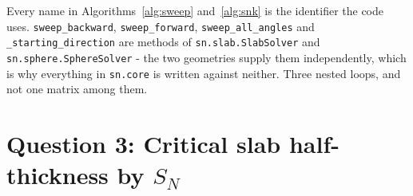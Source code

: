 \documentclass[11pt]{article}
\begin{document}
\begin{algorithm}[tbp]
\caption{The two iterations - scattering inside, Bell \& Glasstone outside -
         \texttt{homework3.sn.core}}
\label{alg:snk}
\BlankLine
{}
\BlankLine
{}
\end{algorithm}

\begin{sloppypar}
Every name in Algorithms~\ref{alg:sweep} and~\ref{alg:snk} is the identifier
the code uses. \texttt{sweep\_backward}, \texttt{sweep\_forward},
\texttt{sweep\_all\_angles} and
\texttt{\_starting\_direction} are methods of \texttt{sn.slab.SlabSolver} and
\texttt{sn.sphere.SphereSolver} - the two geometries supply them independently, which is why
everything in \texttt{sn.core} is written against neither. Three nested loops, and not one
matrix among them.
\end{sloppypar}

\clearpage
\section*{Question 3: Critical slab half-thickness by $S_N$}
\end{document}
